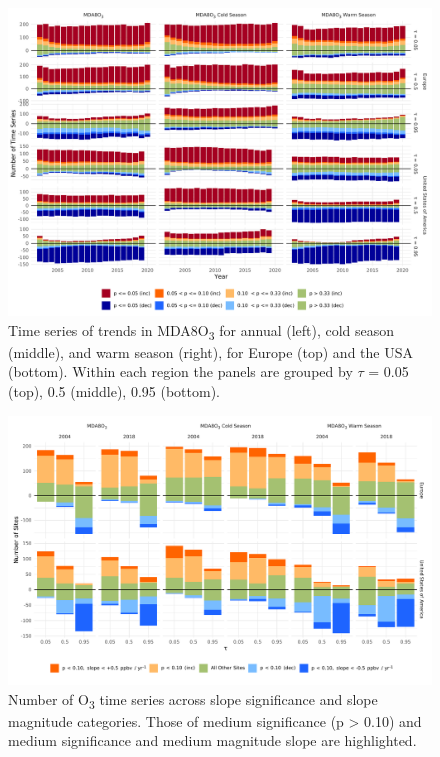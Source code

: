 \documentclass[journal abbreviation, manuscript]{copernicus}
\begin{document}

\begin{figure}[p]
\centering
\includegraphics[width=\textwidth]{figures/paper_figures/f03_signifcance_bars.pdf}
\caption{Time series of trends in MDA8O\textsubscript{3} for annual (left), cold season (middle), and warm season (right), for Europe (top) and the USA (bottom). Within each region the panels are grouped by $\tau$ = 0.05 (top), 0.5 (middle), 0.95 (bottom).}
\label{fig:signifcance_bars}
\end{figure}
\clearpage

\begin{figure}[p]
\includegraphics[width=18cm]{figures/paper_figures/f04_slope_sig_counts.pdf}
\caption{Number of O\textsubscript{3} time series across slope significance and slope magnitude categories. Those of medium significance (p > 0.10) and medium significance and medium magnitude slope are highlighted.}
\label{fig:slope_sig_counts}
\end{figure}
\clearpage
\end{document}
